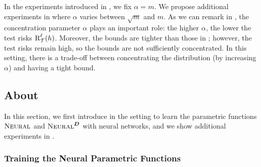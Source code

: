 \documentclass[twoside]{article}
\theoremstyle{plain}
\begin{document}
In the experiments introduced in , we fix $\alpha=m$. 
We propose additional experiments in  where $\alpha$ varies between $\sqrt{m}$ and $m$.
As we can remark in , the concentration parameter $\alpha$ plays an important role: the higher $\alpha$, the lower the test risks $\text{R}^{\ell}_{\mathcal{T}}(h)$.
Moreover, the bounds are tighter than those in ; however, the test risks remain high, so the bounds are not sufficiently concentrated.
In this setting, there is a trade-off between concentrating the distribution (by increasing $\alpha$) and having a tight bound.

\subsection[About Section 4.4]{About }
\label{sec:additional-experiments-neural-comp}

In this section, we first introduce in  the setting to learn the parametric functions $\text{\sc Neural}$ and $\text{\sc Neural}^{\boldsymbol{D}}$ with neural networks, and we show additional experiments in .

\subsubsection{Training the Neural Parametric Functions}
\label{sec:additional-experiments-neural-comp-training}
\end{document}
